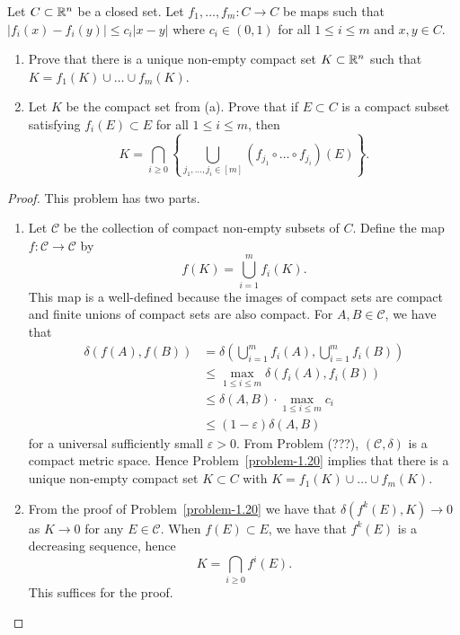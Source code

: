 \documentclass[12pt]{article}
\begin{document}
\begin{problem} \label{problem-2.18}
	Let $C \subset \mathbb{R}^n$ be a closed set. Let $f_1, \ldots, f_m : C \to C$ be maps such that $|f_i(x) - f_i(y)| \leq c_i |x-y|$ where $c_i \in (0, 1)$ for all $1 \leq i \leq m$ and $x, y \in C$. 
    \begin{enumerate}[label = (\alph*)]
        \item Prove that there is a unique non-empty compact set $K \subset \mathbb{R}^n$ such that $K = f_1(K) \cup \ldots \cup f_m(K)$. 
        \item Let $K$ be the compact set from (a). Prove that if $E \subset C$ is a compact subset satisfying $f_i(E) \subset E$ for all $1 \leq i \leq m$, then 
        \[
            K = \bigcap_{i \geq 0} \left \{ \bigcup_{j_1, \ldots, j_i \in [m]} (f_{j_1} \circ \ldots \circ f_{j_i})(E) \right \}.
        \]
    \end{enumerate}
\end{problem}

\begin{proof}
	This problem has two parts. 
	\begin{enumerate}[label = (\alph*)]
		\item Let $\mathcal{C}$ be the collection of compact non-empty subsets of $C$. Define the map $f : \mathcal{C} \to \mathcal{C}$ by 
		\[
			f(K) = \bigcup_{i = 1}^m f_i(K).
		\]
		This map is a well-defined because the images of compact sets are compact and finite unions of compact sets are also compact. For $A, B \in \mathcal{C}$, we have that
		\begin{align*}
			\delta(f(A), f(B)) & = \delta \left ( \bigcup_{i = 1}^m f_i(A) , \bigcup_{i = 1}^m f_i(B) \right ) \\
			& \leq \max_{1 \leq i \leq m} \delta(f_i(A), f_i(B)) \\
			& \leq \delta(A, B) \cdot \max_{1 \leq i \leq m} c_i \\
			& \leq (1 - \varepsilon) \delta(A, B)
		\end{align*}
		for a universal sufficiently small $\varepsilon > 0$. From Problem (???), $(\mathcal{C}, \delta)$ is a compact metric space. Hence Problem~\ref{problem-1.20} implies that there is a unique non-empty compact set $K \subset C$ with $K = f_1(K) \cup \ldots \cup f_m(K)$. 

		\item From the proof of Problem~\ref{problem-1.20} we have that $\delta(f^k(E), K) \to 0$ as $K \to 0$ for any $E \in \mathcal{C}$. When $f(E) \subset E$, we have that $f^k(E)$ is a decreasing sequence, hence 
		\[
			K = \bigcap_{i \geq 0} f^i(E).
		\]
		This suffices for the proof. 
	\end{enumerate}
\end{proof}
\end{document}

